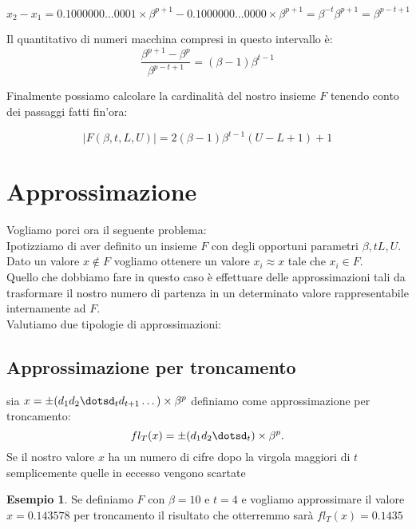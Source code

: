 \documentclass[12pt, a4paper]{book}
\theoremstyle{definition}
\newtheorem{exmp}{Esempio}[section]
\begin{document}
\begin{flushleft}
\[ x_{2} - x_{1} = 0.1000000\dots0001 \times \beta^{p+1} - 0.1000000\dots0000 \times \beta^{p+1} = \beta^{-t}\beta^{p+1} = \beta^{p-t+1} \]

Il quantitativo di numeri macchina compresi in questo intervallo è: 
\[ \frac{\beta^{p+1} - \beta^{p}}{\beta^{p-t+1}}  =(\beta-1)\beta^{t-1}\]

Finalmente possiamo calcolare la cardinalità del nostro insieme $F$ tenendo conto dei passaggi fatti fin'ora: 

\[ |F(\beta, t, L,U)| = 2(\beta-1)\beta^{t-1}(U-L+1) + 1\]


\end{flushleft}

\section{Approssimazione}
\begin{flushleft}
Vogliamo porci ora il seguente problema: \\
Ipotizziamo di aver definito un insieme $F$ con degli opportuni parametri $\beta, t L,U$. Dato un valore $x \notin F$ vogliamo ottenere un valore $x_{i} \approx x$ tale che $x_{i} \in F$.\\
Quello che dobbiamo fare in questo caso è effettuare delle approssimazioni tali da trasformare il nostro numero di partenza in un determinato valore rappresentabile internamente ad $F$. \\
Valutiamo due tipologie di approssimazioni: 
\end{flushleft}

\subsection{Approssimazione per troncamento}
\begin{flushleft}
sia $x = \pm(d_{1}d_{2}\dotsd_{t}d_{t+1}\dots)\times \beta^{p}$ definiamo come approssimazione per troncamento: 
\[ 
	fl_{T}(x) = \pm(d_{1}d_{2}\dotsd_{t})\times \beta^{p}.
\]
Se il nostro valore $x$ ha un numero di cifre dopo la virgola maggiori di $t$ semplicemente quelle in eccesso vengono scartate

\begin{exmp}
Se definiamo $F$ con $\beta = 10 $ e $t = 4$ e vogliamo approssimare il valore $x = 0.143578$ per troncamento il risultato che otterremmo sarà $ fl_{T}(x) = 0.1435 $
\end{exmp}
\end{flushleft}
\end{document}
